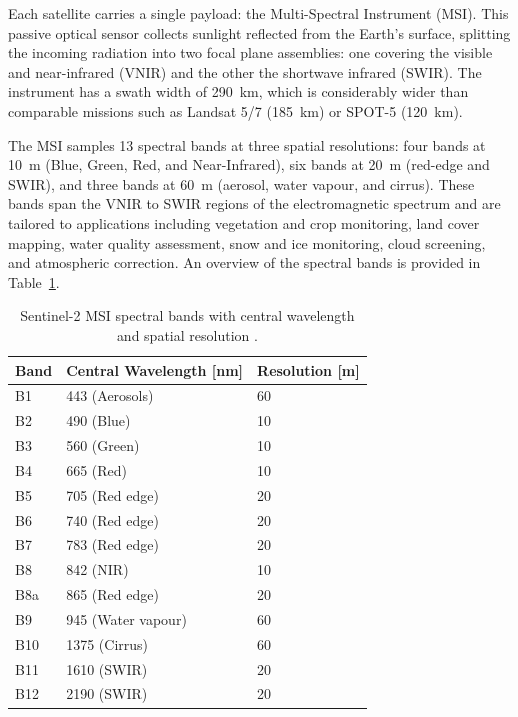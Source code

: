 Each satellite carries a single payload: the Multi-Spectral Instrument (MSI). This passive optical sensor collects sunlight reflected from the Earth’s surface, splitting the incoming radiation into two focal plane assemblies: one covering the visible and near-infrared (VNIR) and the other the shortwave infrared (SWIR). The instrument has a swath width of 290~km, which is considerably wider than comparable missions such as Landsat 5/7 (185~km) or SPOT-5 (120~km).  

The MSI samples 13 spectral bands at three spatial resolutions: four bands at 10~m (Blue, Green, Red, and Near-Infrared), six bands at 20~m (red-edge and SWIR), and three bands at 60~m (aerosol, water vapour, and cirrus). These bands span the VNIR to SWIR regions of the electromagnetic spectrum and are tailored to applications including vegetation and crop monitoring, land cover mapping, water quality assessment, snow and ice monitoring, cloud screening, and atmospheric correction. An overview of the spectral bands is provided in Table~\ref{tab:sentinel2_bands}.  

\begin{table}[h]
\centering
\caption[Sentinel-2 MSI spectral bands]{Sentinel-2 MSI spectral bands with central wavelength and spatial resolution \cite{sentiwiki}.}
\label{tab:sentinel2_bands}
\begin{tabular}{@{}lll@{}}
\toprule
\textbf{Band} & \textbf{Central Wavelength [nm]} & \textbf{Resolution [m]} \\ \midrule
B1  & 443  (Aerosols)                & 60 \\
B2  & 490  (Blue)                    & 10 \\
B3  & 560  (Green)                   & 10 \\
B4  & 665  (Red)                     & 10 \\
B5  & 705  (Red edge)                & 20 \\
B6  & 740  (Red edge)                & 20 \\
B7  & 783  (Red edge)                & 20 \\
B8  & 842  (NIR)                     & 10 \\
B8a & 865  (Red edge)                & 20 \\
B9  & 945  (Water vapour)            & 60 \\
B10 & 1375 (Cirrus)                  & 60 \\
B11 & 1610 (SWIR)                    & 20 \\
B12 & 2190 (SWIR)                    & 20 \\ \bottomrule
\end{tabular}
\end{table}

